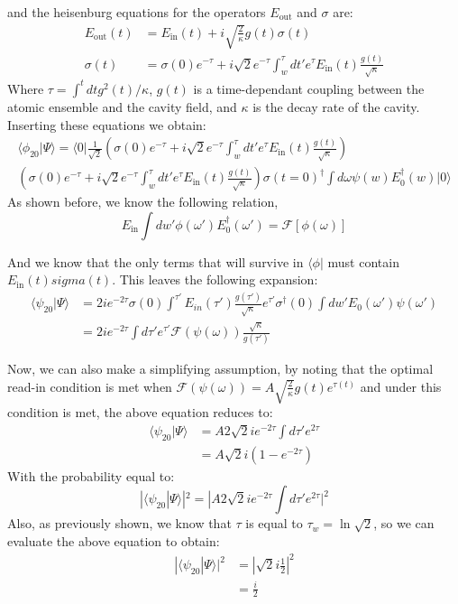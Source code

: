 \documentclass[12pt]{article}
\begin{document}
and the heisenburg equations for the operators $E_\textrm{out}$ and $\sigma$ are:
\begin{align}
E_\textrm{out}(t) &= E_\textrm{in}(t) + i \sqrt{\frac{2}{\kappa}} g(t) \sigma(t) \\
\sigma(t) &= \sigma(0) e^{-\tau} + i\sqrt{2} e^{-\tau} \int^\tau_w d t' e^\tau E_\textrm{in}(t) \frac{g(t)}{\sqrt{\kappa}}
\end{align}
Where $\tau = \int^t dt g^2(t)/\kappa$, $g(t)$ is a time-dependant coupling between the atomic ensemble and the cavity field, and $\kappa$ is the decay rate of the cavity. Inserting these equations we obtain:
\begin{multline}
\langle \phi_{20}| \Psi \rangle =\langle 0 | \frac{1}{\sqrt{2}} \left (  \sigma(0) e^{-\tau} + i\sqrt{2} e^{-\tau} \int^\tau_w d t' e^\tau E_\textrm{in}(t) \frac{g(t)}{\sqrt{\kappa}} \right )\\ \left ( \sigma(0) e^{-\tau} + i\sqrt{2} e^{-\tau} \int^\tau_w d t' e^\tau E_\textrm{in}(t) \frac{g(t)}{\sqrt{\kappa}} \right ) \sigma(t=0)^\dagger \int d\omega \psi(w) E_0^\dagger(w) | 0 \rangle
\end{multline}
As shown before, we know the following relation,
\begin{equation}
E_\textrm{in} \int dw' \phi(\omega') E_0^\dagger(\omega') = \mathscr{F}[\phi(\omega)]
\end{equation}

And we know that the only terms that will survive in $\langle \phi |$ must contain $E_\textrm{in}(t) sigma(t)$. This leaves the following expansion:
\begin{align}
\langle \psi_{20}| \Psi \rangle &= 2 i e^{-2\tau} \sigma(0) 
\int^{\tau'} E_{in}(\tau') \frac{g(\tau')}{\sqrt{\kappa}} e^{\tau'} \sigma^\dagger(0) \int dw' E_0(\omega') \psi(\omega')\\ 
&= 2 i e^{-2 \tau} \int d \tau' e^{\tau'} 
 \mathscr{F}(\psi(\omega)) \frac{\sqrt{\kappa}}{g(\tau')}
\end{align}

Now, we can also make a simplifying assumption, by noting that the optimal read-in condition is met when $\mathscr{F}(\psi(\omega)) =A \sqrt{\frac{2}{\kappa}} g(t) e^{\tau(t)}$ and under this condition is met, the above equation reduces to:
\begin{align}
\langle \psi_{20}| \Psi \rangle & =A 2\sqrt{2} i e^{-2\tau} \int d \tau' e^{2 \tau} \\
& =A \sqrt{2} i\left(1- e^{-2\tau}\right)
\end{align}
With the probability equal to:
\begin{equation}
\label{p20}
|\langle \psi_{20}| \Psi \rangle|^2=|A 2\sqrt{2} i e^{-2\tau} \int d \tau' e^{2 \tau}|^2 
\end{equation}
Also, as previously shown, we know that $\tau$ is equal to $\tau_w = \ln{\sqrt{2}}$, so we can evaluate the above equation to obtain:
\begin{align}
|\langle \psi_{20}| \Psi \rangle|^2 &= |\sqrt{2} i \frac{1}{2}|^2 \\
&= \frac{i}{2}
\end{align}
\end{document}
